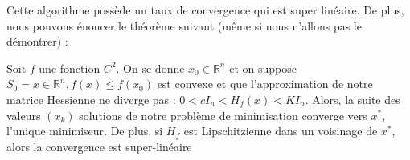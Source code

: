 Cette algorithme possède un taux de convergence qui est super linéaire. De plus, nous pouvons énoncer le théorème suivant (même si nous n'allons pas le démontrer) : 

\begin{theoreme}
		Soit $f$ une fonction $C^2$. On se donne $x_0 \in \mathbb{R}^n$ et on suppose $S_0 = {x\in \mathbb{R}^n, f(x) \leq f(x_0)}$ est convexe et que l'approximation de notre matrice Hessienne ne diverge pas : $ 0 < cI_n < H_f(x) < KI_n$. Alors, la suite des valeurs $(x_k)$ solutions de notre problème de minimisation converge vers $x^*$, l'unique minimiseur. De plus, si $H_f$ est Lipschitzienne dans un voisinage de $x^*$, alors la convergence est super-linéaire
\end{theoreme}

